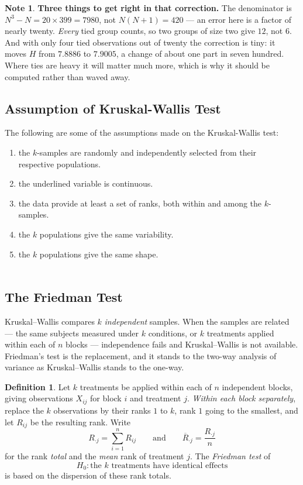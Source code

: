 \documentclass[11pt,a4paper]{article}
\theoremstyle{definition}
\newtheorem{definition}[thm]{Definition}
\newtheorem{note}[thm]{Note}
\begin{document}
\begin{note}
\textbf{Three things to get right in that correction.} The denominator is
$N^{3}-N = 20 \times 399 = 7980$, not $N(N+1) = 420$ --- an error here is a factor of
nearly twenty. \emph{Every} tied group counts, so two groups of size two give $12$,
not $6$. And with only four tied observations out of twenty the correction is
tiny: it moves $H$ from $7.8886$ to $7.9005$, a change of about one part in seven
hundred. Where ties are heavy it will matter much more, which is why it should be
computed rather than waved away.
\end{note}

\subsection{Assumption of Kruskal-Wallis Test}
The following are some of the assumptions made on the Kruskal-Wallis test:
\begin{enumerate}
\item the $k$-samples are randomly and independently selected from their\\ respective populations.
\item the underlined variable is continuous.
\item the data provide at least a set of ranks, both within and among the $k$-samples.
\item the $k$ populations give the same variability.
\item the $k$ populations give the same shape.\\\\
\end{enumerate}








\pagebreak
\subsection{The Friedman Test}

Kruskal--Wallis compares $k$ \emph{independent} samples. When the samples are
related --- the same subjects measured under $k$ conditions, or $k$ treatments
applied within each of $n$ blocks --- independence fails and Kruskal--Wallis is not
available. Friedman's test is the replacement, and it stands to the two-way
analysis of variance as Kruskal--Wallis stands to the one-way.

\begin{definition}
Let $k$ treatments be applied within each of $n$ independent blocks, giving
observations $X_{ij}$ for block $i$ and treatment $j$. \emph{Within each block
separately}, replace the $k$ observations by their ranks $1$ to $k$, rank $1$ going
to the smallest, and let $R_{ij}$ be the resulting rank. Write
$$R_{\cdot j} = \sum^{n}_{i=1} R_{ij}
\qquad\text{and}\qquad
\overline{R}_{\cdot j} = \dfrac{R_{\cdot j}}{n}$$
for the rank \emph{total} and the \emph{mean} rank of treatment $j$. The
\emph{Friedman test} of
$$H_0 : \text{the } k \text{ treatments have identical effects}$$
is based on the dispersion of these rank totals.
\end{definition}
\end{document}
